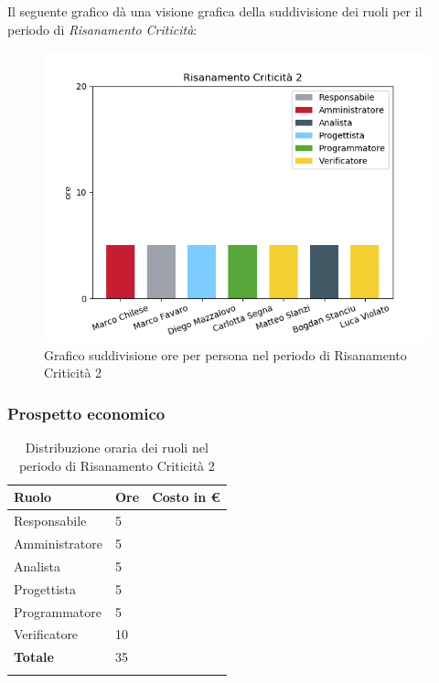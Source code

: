 Il seguente grafico dà una visione grafica della suddivisione dei ruoli per il periodo di \textit{Risanamento Criticità}:\begin{figure}[H]
	\centering
  		\includegraphics[width=1\linewidth]{./images/fig_rc2.png}
  		\caption{Grafico suddivisione ore per persona nel periodo di Risanamento Criticità 2}
  		\label{fig:grafico suddivione ruoli rc2}
\end{figure}



\subsubsection{Prospetto economico}
\begin{longtable}{| C{.30\textwidth}| C{.15\textwidth}| C{.20\textwidth}|}
\hline
\textbf{Ruolo} & \textbf{Ore} & \textbf{Costo in \euro} \\
\hline 
Responsabile & 5 &  \\
\hline
Amministratore & 5 &  \\
\hline
Analista & 5 &  \\
\hline
Progettista & 5 & \\
\hline
Programmatore & 5 &  \\
\hline 
Verificatore & 10 &  \\
\hline
\textbf{Totale} & 35 &  \\
\hline 

\caption{Distribuzione oraria dei ruoli nel periodo di Risanamento Criticità 2}
\label{Distribuzione oraria rc2}
\end{longtable}

